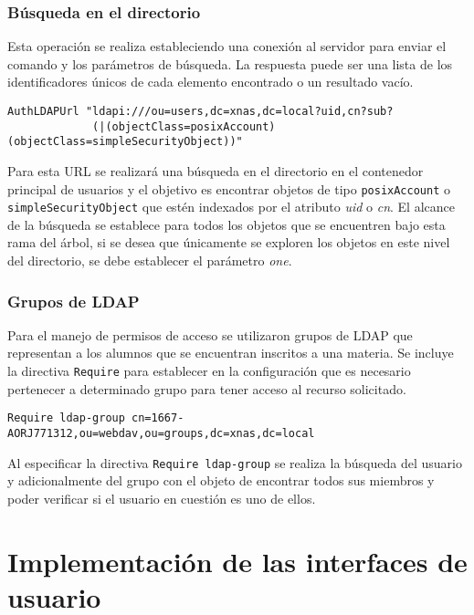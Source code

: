         \subsubsection {B\'{u}squeda en el directorio}

Esta operaci\'{o}n se realiza estableciendo una conexi\'{o}n al servidor para enviar el comando y los par\'{a}metros de b\'{u}squeda. La respuesta puede ser una lista de los identificadores \'{u}nicos de cada elemento encontrado o un resultado vac\'{i}o.

{
\scriptsize
\linespread{1}
\begin{verbatim}
AuthLDAPUrl "ldapi:///ou=users,dc=xnas,dc=local?uid,cn?sub?
             (|(objectClass=posixAccount)(objectClass=simpleSecurityObject))"
\end{verbatim}
}


Para esta URL se realizar\'{a} una b\'{u}squeda en el directorio en el contenedor principal de usuarios y el objetivo es encontrar objetos de tipo \texttt{posixAccount} o \texttt{simpleSecurityObject} que est\'{e}n indexados por el atributo \textsl{uid} o \textsl{cn}. El alcance de la b\'{u}squeda se establece para todos los objetos que se encuentren bajo esta rama del \'{a}rbol, si se desea que \'{u}nicamente se exploren los objetos en este nivel del directorio, se debe establecer el par\'{a}metro \textsl{one}.

        \subsubsection {Grupos de \textsc{LDAP}}

Para el manejo de permisos de acceso se utilizaron grupos de \textsc{LDAP} que representan a los alumnos que se encuentran inscritos a una materia. Se incluye la directiva \texttt{Require} para establecer en la configuraci\'{o}n que es necesario pertenecer a determinado grupo para tener acceso al recurso solicitado.

{
\scriptsize
\linespread{1}
\begin{verbatim}
Require ldap-group cn=1667-AORJ771312,ou=webdav,ou=groups,dc=xnas,dc=local
\end{verbatim}
}

Al especificar la directiva \texttt{Require ldap-group} se realiza la b\'{u}squeda del usuario y adicionalmente del grupo con el objeto de encontrar todos sus miembros y poder verificar si el usuario en cuesti\'{o}n es uno de ellos.


    \section {Implementaci\'{o}n de las interfaces de usuario}

